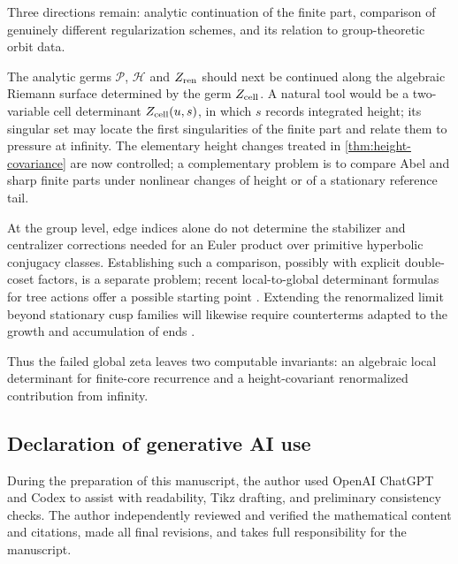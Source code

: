 \documentclass[11pt,reqno]{amsart}
\numberwithin{equation}{section}
\theoremstyle{definition}
\theoremstyle{remark}
\begin{document}
Three directions remain: analytic continuation of the finite part, comparison
of genuinely different regularization schemes, and its relation to
group-theoretic orbit data.

The analytic germs $\mathscr P$, $\mathscr H$ and $Z_{\rm ren}$ should next be
continued along the algebraic Riemann surface determined by the germ
$Z_{\rm cell}$.  A natural tool would be a two-variable cell determinant
$Z_{\rm cell}(u,s)$, in which $s$ records integrated height; its singular set
may locate the first singularities of the finite part and relate them to
pressure at infinity.  The elementary height changes treated in
\cref{thm:height-covariance} are now controlled; a complementary problem is to
compare Abel and sharp finite parts under nonlinear changes of height or of a
stationary reference tail.

At the group level, edge indices alone do not determine the stabilizer and
centralizer corrections needed for an Euler product over primitive hyperbolic
conjugacy classes.  Establishing such a comparison, possibly with explicit
double-coset factors, is a separate problem; recent local-to-global determinant
formulas for tree actions offer a possible starting point
\cite{Marchionna2026}.  Extending the renormalized limit beyond stationary
cusp families will likewise require counterterms adapted to the growth and
accumulation of ends
\cite{BroiseParkkonenPaulin2019,BroiseParkkonenPaulin2021}.

Thus the failed global zeta leaves two computable invariants: an algebraic
local determinant for finite-core recurrence and a height-covariant
renormalized contribution from infinity.

\subsection*{Declaration of generative AI use}

During the preparation of this manuscript, the author used OpenAI ChatGPT and
Codex to assist with readability, Tikz drafting, and preliminary consistency checks.  The author independently
reviewed and verified the mathematical content and citations, made all final
revisions, and takes full responsibility for the manuscript.
\end{document}
